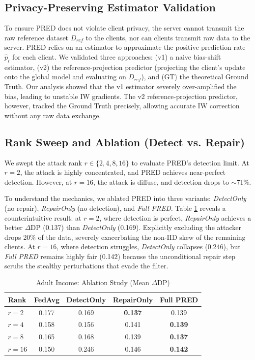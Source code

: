 \documentclass[journal]{IEEEtran}
\begin{document}
\subsection{Privacy-Preserving Estimator Validation}
To ensure PRED does not violate client privacy, the server cannot transmit the raw reference dataset $D_{ref}$ to the clients, nor can clients transmit raw data to the server. PRED relies on an estimator to approximate the positive prediction rate $\hat{p}_i$ for each client. We validated three approaches: (v1) a naive bias-shift estimator, (v2) the reference-projection predictor (projecting the client's update onto the global model and evaluating on $D_{ref}$), and (GT) the theoretical Ground Truth. Our analysis showed that the v1 estimator severely over-amplified the bias, leading to unstable IW gradients. The v2 reference-projection predictor, however, tracked the Ground Truth precisely, allowing accurate IW correction without any raw data exchange.

\subsection{Rank Sweep and Ablation (Detect vs. Repair)}
We swept the attack rank $r \in \{2, 4, 8, 16\}$ to evaluate PRED's detection limit. At $r=2$, the attack is highly concentrated, and PRED achieves near-perfect detection. However, at $r=16$, the attack is diffuse, and detection drops to $\sim$71\%. 

To understand the mechanics, we ablated PRED into three variants: \textit{DetectOnly} (no repair), \textit{RepairOnly} (no detection), and \textit{Full PRED}. Table \ref{tab:ablation} reveals a counterintuitive result: at $r=2$, where detection is perfect, \textit{RepairOnly} achieves a better $\Delta$DP (0.137) than \textit{DetectOnly} (0.169). Explicitly excluding the attacker drops 20\% of the data, severely exacerbating the non-IID skew of the remaining clients. At $r=16$, where detection struggles, \textit{DetectOnly} collapses (0.246), but \textit{Full PRED} remains highly fair (0.142) because the unconditional repair step scrubs the stealthy perturbations that evade the filter.

\begin{table}[htbp]
\centering
\caption{Adult Income: Ablation Study (Mean $\Delta$DP)}
\label{tab:ablation}
\begin{tabular}{lcccc}
\toprule
\textbf{Rank} & \textbf{FedAvg} & \textbf{DetectOnly} & \textbf{RepairOnly} & \textbf{Full PRED} \\
\midrule
$r=2$ & 0.177 & 0.169 & \textbf{0.137} & 0.139 \\
$r=4$ & 0.158 & 0.156 & 0.141 & \textbf{0.139} \\
$r=8$ & 0.165 & 0.168 & 0.139 & \textbf{0.137} \\
$r=16$& 0.150 & 0.246 & 0.146 & \textbf{0.142} \\
\bottomrule
\end{tabular}
\end{table}
\end{document}
